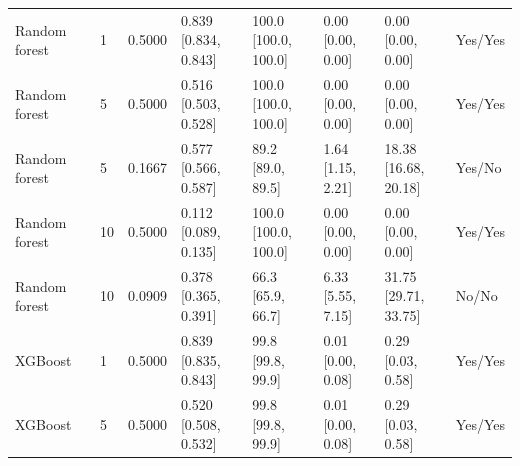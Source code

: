 \begin{longtable}{llllllll}
Random forest & 1 & 0.5000 & \shortstack{{0.839} \\ {[0.834, 0.843]}} & \shortstack{{100.0} \\ {[100.0, 100.0]}} & \shortstack{{0.00} \\ {[0.00, 0.00]}} & \shortstack{{0.00} \\ {[0.00, 0.00]}} & Yes/Yes \\
Random forest & 5 & 0.5000 & \shortstack{{0.516} \\ {[0.503, 0.528]}} & \shortstack{{100.0} \\ {[100.0, 100.0]}} & \shortstack{{0.00} \\ {[0.00, 0.00]}} & \shortstack{{0.00} \\ {[0.00, 0.00]}} & Yes/Yes \\
Random forest & 5 & 0.1667 & \shortstack{{0.577} \\ {[0.566, 0.587]}} & \shortstack{{89.2} \\ {[89.0, 89.5]}} & \shortstack{{1.64} \\ {[1.15, 2.21]}} & \shortstack{{18.38} \\ {[16.68, 20.18]}} & Yes/No \\
Random forest & 10 & 0.5000 & \shortstack{{0.112} \\ {[0.089, 0.135]}} & \shortstack{{100.0} \\ {[100.0, 100.0]}} & \shortstack{{0.00} \\ {[0.00, 0.00]}} & \shortstack{{0.00} \\ {[0.00, 0.00]}} & Yes/Yes \\
Random forest & 10 & 0.0909 & \shortstack{{0.378} \\ {[0.365, 0.391]}} & \shortstack{{66.3} \\ {[65.9, 66.7]}} & \shortstack{{6.33} \\ {[5.55, 7.15]}} & \shortstack{{31.75} \\ {[29.71, 33.75]}} & No/No \\
XGBoost & 1 & 0.5000 & \shortstack{{0.839} \\ {[0.835, 0.843]}} & \shortstack{{99.8} \\ {[99.8, 99.9]}} & \shortstack{{0.01} \\ {[0.00, 0.08]}} & \shortstack{{0.29} \\ {[0.03, 0.58]}} & Yes/Yes \\
XGBoost & 5 & 0.5000 & \shortstack{{0.520} \\ {[0.508, 0.532]}} & \shortstack{{99.8} \\ {[99.8, 99.9]}} & \shortstack{{0.01} \\ {[0.00, 0.08]}} & \shortstack{{0.29} \\ {[0.03, 0.58]}} & Yes/Yes \\

\end{longtable}
